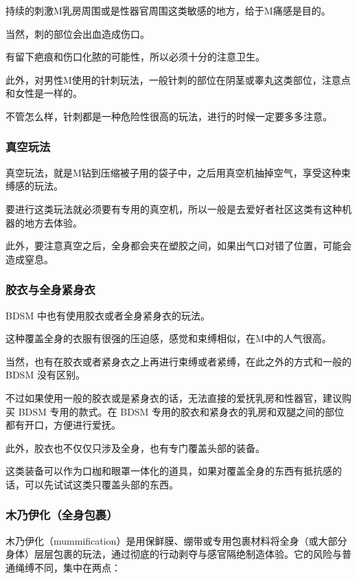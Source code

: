 \documentclass[12pt,UTF8]{ctexbook}
\begin{document}
持续的刺激M乳房周围或是性器官周围这类敏感的地方，给于M痛感是目的。

当然，刺的部位会出血造成伤口。

有留下疤痕和伤口化脓的可能性，所以必须十分的注意卫生。

此外，对男性M使用的针刺玩法，一般针刺的部位在阴茎或睾丸这类部位，注意点和女性是一样的。

不管怎么样，针刺都是一种危险性很高的玩法，进行的时候一定要多多注意。 

\subsubsection{真空玩法}

真空玩法，就是M钻到压缩被子用的袋子中，之后用真空机抽掉空气，享受这种束缚感的玩法。

要进行这类玩法就必须要有专用的真空机，所以一般是去爱好者社区这类有这种机器的地方去体验。

此外，要注意真空之后，全身都会夹在塑胶之间，如果出气口对错了位置，可能会造成窒息。 

\subsubsection{胶衣与全身紧身衣}

BDSM 中也有使用胶衣或者全身紧身衣的玩法。

这种覆盖全身的衣服有很强的压迫感，感觉和束缚相似，在M中的人气很高。

当然，也有在胶衣或者紧身衣之上再进行束缚或者紧缚，在此之外的方式和一般的 BDSM 没有区别。

不过如果使用一般的胶衣或是紧身衣的话，无法直接的爱抚乳房和性器官，建议购买 BDSM 专用的款式。在 BDSM 专用的胶衣和紧身衣的乳房和双腿之间的部位都有开口，方便进行爱抚。

此外，胶衣也不仅仅只涉及全身，也有专门覆盖头部的装备。

这类装备可以作为口枷和眼罩一体化的道具，如果对覆盖全身的东西有抵抗感的话，可以先试试这类只覆盖头部的东西。

\subsubsection{木乃伊化（全身包裹）}

木乃伊化（mummification）是用保鲜膜、绷带或专用包裹材料将全身（或大部分身体）层层包裹的玩法，通过彻底的行动剥夺与感官隔绝制造体验。它的风险与普通绳缚不同，集中在两点：
\end{document}
